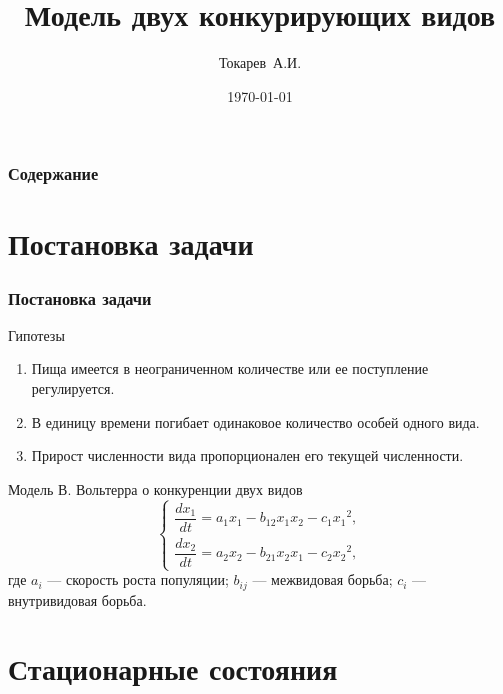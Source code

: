 \documentclass[unicode]{beamer}
\title[Курсовая работа]{Модель двух конкурирующих видов}
\author[Токарев~А.И.]{Токарев~А.И.}
\institute[]{МГТУ им. Н.Э. Баумана}
\date{\today}
\begin{document}
    \begin{frame}
        \titlepage
    \end{frame}

    \begin{frame}
        \frametitle{Содержание}
        \tableofcontents
    \end{frame}

    \section{Постановка задачи}
    \begin{frame}
        \frametitle{Постановка задачи}
        \begin{block}{Гипотезы}
            \fontsize{10.4pt}{12pt}\selectfont
            \begin{enumerate}
                \item Пища имеется в неограниченном количестве или ее поступление регулируется.
                \item В единицу времени погибает одинаковое количество особей одного вида.
                \item Прирост численности вида пропорционален его текущей численности.
            \end{enumerate}
        \end{block}

        \begin{block}{Модель В. Вольтерра о конкуренции двух видов}
            \fontsize{10pt}{12pt}\selectfont
            \begin{equation}
                \label{volterra}
                \begin{cases}
                    \dfrac{dx_1}{dt} = a_1 x_1 - b_{12} x_1 x_2 - c_1 {x_1}\!^2,
                    \\[1em]
                    \dfrac{dx_2}{dt} = a_2 x_2 - b_{21} x_2 x_1 - c_2 {x_2}\!^2 ,
                \end{cases}
            \end{equation}
            \noindent где $a_i$ --- скорость роста популяции; $b_{ij}$ --- межвидовая борьба; $c_i$ --- внутривидовая борьба.
        \end{block}
    \end{frame}

    \section{Стационарные состояния}
\end{document}
